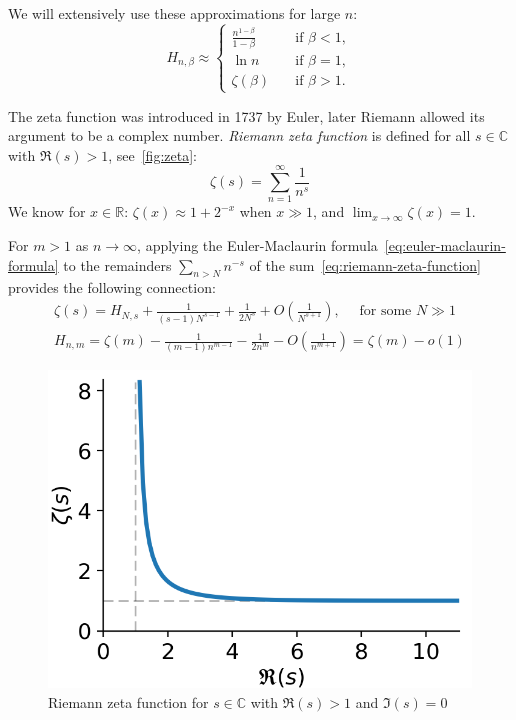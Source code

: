We will extensively use these approximations for large $n$:
\begin{equation}
    H_{n,\beta}\approx
    \begin{cases}
        \frac{n^{1-\beta}}{1-\beta} & \quad \text{if } \beta<1,\\
        \ln n & \quad \text{if } \beta=1,\\
        \zeta(\beta) & \quad \text{if } \beta>1.
    \end{cases}
\end{equation}

The zeta function was introduced in 1737 by Euler, later Riemann allowed its argument to be a complex number.
\textit{Riemann zeta function} is defined for all $s\in\mathbb{C}$ with $\Re(s)>1$, see~\autoref{fig:zeta}:
\begin{equation}
    \label{eq:riemann-zeta-function}
    \zeta(s)=\sum_{n=1}^{\infty}\frac{1}{n^s}
\end{equation}
We know for $x\in\mathbb{R}$: $\zeta(x)\approx 1+2^{-x}$ when $x\gg 1$,
and $\lim_{x\to\infty}\zeta(x)=1$.

For $m>1$ as $n\to\infty$, applying the Euler-Maclaurin formula~\eqref{eq:euler-maclaurin-formula}
to the remainders $\sum_{n>N}{n^{-s}}$ of the sum~\eqref{eq:riemann-zeta-function}
provides the following connection:
\begin{gather}
    \zeta(s)=H_{N,s}+\frac{1}{(s-1)N^{s-1}}+\frac{1}{2N^s}+O\left(\frac{1}{N^{s+1}}\right),\quad\text{ for some }N\gg1\\
    H_{n,m}=\zeta(m)-\frac{1}{(m-1)n^{m-1}}-\frac{1}{2n^m}-O\left(\frac{1}{n^{m+1}}\right)
    =\zeta(m)-o(1)
\end{gather}

\begin{figure}
    \centering
    \includegraphics[scale=0.75]{images/generated/zeta}
    \caption[Riemann zeta function]{Riemann zeta function for $s\in\mathbb{C}$ with $\Re(s)>1$ and $\Im(s)=0$}
    \label{fig:zeta}
\end{figure}

